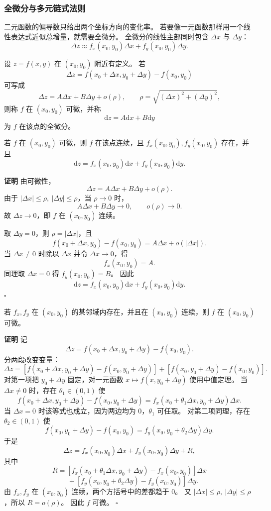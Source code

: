 \documentclass[fontset=fandol]{ctexart}
\newenvironment{proofdetail}{\par\noindent\textbf{证明}\quad}{\hfill$\square$\par\vspace{0.8em}}
\newcommand{\dd}{\mathrm{d}}
\begin{document}
\subsubsection*{全微分与多元链式法则}

二元函数的偏导数只给出两个坐标方向的变化率。 若要像一元函数那样用一个线性表达式近似总增量，就需要全微分。 全微分的线性主部同时包含 $\Delta x$ 与 $\Delta y$：
\[
\Delta z\approx f_x(x_0,y_0)\Delta x+f_y(x_0,y_0)\Delta y.
\]

\begin{definition}[二元函数可微与全微分]
设 $z=f(x,y)$ 在 $(x_0,y_0)$ 附近有定义。 若
\[
\Delta z=f(x_0+\Delta x,y_0+\Delta y)-f(x_0,y_0)
\]
可写成
\[
\Delta z=A\Delta x+B\Delta y+o(\rho),
\qquad \rho=\sqrt{(\Delta x)^2+(\Delta y)^2},
\]
则称 $f$ 在 $(x_0,y_0)$ 可微，并称
\[
\dd z=A\dd x+B\dd y
\]
为 $f$ 在该点的全微分。
\end{definition}

\begin{theorem}[可微推出连续且偏导存在]
若 $f$ 在 $(x_0,y_0)$ 可微，则 $f$ 在该点连续，且 $f_x(x_0,y_0),f_y(x_0,y_0)$ 存在，并且
\[
\dd z=f_x(x_0,y_0)\dd x+f_y(x_0,y_0)\dd y.
\]
\end{theorem}
\begin{proofdetail}
由可微性，
\[
\Delta z=A\Delta x+B\Delta y+o(\rho).
\]
由于 $|\Delta x|\leq\rho,\ |\Delta y|\leq\rho$，当 $\rho\to0$ 时，
\[
A\Delta x+B\Delta y\to0,\qquad o(\rho)\to0.
\]
故 $\Delta z\to0$，即 $f$ 在 $(x_0,y_0)$ 连续。

取 $\Delta y=0$，则 $\rho=|\Delta x|$，且
\[
f(x_0+\Delta x,y_0)-f(x_0,y_0)=A\Delta x+o(|\Delta x|).
\]
当 $\Delta x\neq0$ 时除以 $\Delta x$ 并令 $\Delta x\to0$，得
\[
f_x(x_0,y_0)=A.
\]
同理取 $\Delta x=0$ 得 $f_y(x_0,y_0)=B$。 因此
\[
\dd z=f_x(x_0,y_0)\dd x+f_y(x_0,y_0)\dd y.
\]
\end{proofdetail}

\begin{theorem}[偏导连续推出可微]
若 $f_x,f_y$ 在 $(x_0,y_0)$ 的某邻域内存在，并且在 $(x_0,y_0)$ 连续，则 $f$ 在 $(x_0,y_0)$ 可微。
\end{theorem}
\begin{proofdetail}
记
\[
\Delta z=f(x_0+\Delta x,y_0+\Delta y)-f(x_0,y_0).
\]
分两段改变变量：
\[
\Delta z=[f(x_0+\Delta x,y_0+\Delta y)-f(x_0,y_0+\Delta y)]
+[f(x_0,y_0+\Delta y)-f(x_0,y_0)].
\]
对第一项把 $y_0+\Delta y$ 固定，对一元函数 $x\mapsto f(x,y_0+\Delta y)$ 使用中值定理。 当 $\Delta x\neq0$ 时，存在 $\theta_1\in(0,1)$ 使
\[
f(x_0+\Delta x,y_0+\Delta y)-f(x_0,y_0+\Delta y)
=f_x(x_0+\theta_1\Delta x,y_0+\Delta y)\Delta x.
\]
当 $\Delta x=0$ 时该等式也成立，因为两边均为 $0$，$\theta_1$ 可任取。 对第二项同理，存在 $\theta_2\in(0,1)$ 使
\[
f(x_0,y_0+\Delta y)-f(x_0,y_0)
=f_y(x_0,y_0+\theta_2\Delta y)\Delta y.
\]
于是
\[
\Delta z=f_x(x_0,y_0)\Delta x+f_y(x_0,y_0)\Delta y+R,
\]
其中
\[
R=[f_x(x_0+\theta_1\Delta x,y_0+\Delta y)-f_x(x_0,y_0)]\Delta x
\]
\[
\quad+[f_y(x_0,y_0+\theta_2\Delta y)-f_y(x_0,y_0)]\Delta y.
\]
由 $f_x,f_y$ 在 $(x_0,y_0)$ 连续，两个方括号中的差都趋于 $0$。 又 $|\Delta x|\leq\rho,\ |\Delta y|\leq\rho$，所以 $R=o(\rho)$。 因此 $f$ 可微。
\end{proofdetail}
\end{document}
